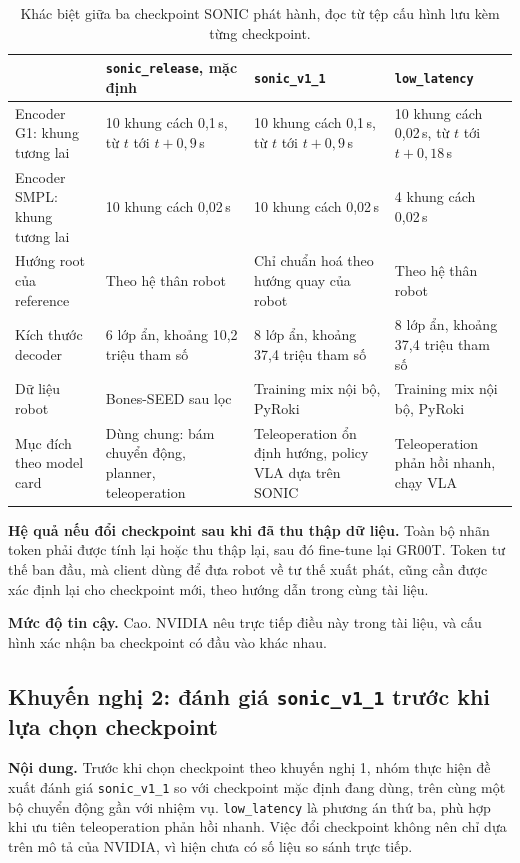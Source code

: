 \documentclass[12pt,a4paper,oneside]{report}
\newcommand{\code}[1]{\texttt{#1}}
\begin{document}
\begin{table}[htbp]
\centering\footnotesize
\caption[Khác biệt giữa ba checkpoint SONIC phát hành, đọc từ tệp cấu hình lưu kèm từng checkpoint]{Khác biệt giữa ba checkpoint SONIC phát hành, đọc từ tệp cấu hình lưu kèm từng checkpoint.}
\label{tab:ckpt_obs}
\begin{tabular}{L{3.6cm}L{3.4cm}L{3.4cm}L{3.4cm}}
\toprule
& \textbf{\code{sonic\_release}, mặc định} & \textbf{\code{sonic\_v1\_1}} & \textbf{\code{low\_latency}}\\
\midrule
Encoder G1: khung tương lai & 10 khung cách 0,1\,s, từ $t$ tới $t+0{,}9$\,s & 10 khung cách 0,1\,s, từ $t$ tới $t+0{,}9$\,s & 10 khung cách 0,02\,s, từ $t$ tới $t+0{,}18$\,s\\
Encoder SMPL: khung tương lai & 10 khung cách 0,02\,s & 10 khung cách 0,02\,s & 4 khung cách 0,02\,s\\
Hướng root của reference & Theo hệ thân robot & Chỉ chuẩn hoá theo hướng quay của robot & Theo hệ thân robot\\
Kích thước decoder & 6 lớp ẩn, khoảng 10,2 triệu tham số & 8 lớp ẩn, khoảng 37,4 triệu tham số & 8 lớp ẩn, khoảng 37,4 triệu tham số\\
Dữ liệu robot & Bones-SEED sau lọc & Training mix nội bộ, PyRoki & Training mix nội bộ, PyRoki\\
Mục đích theo model card & Dùng chung: bám chuyển động, planner, teleoperation & Teleoperation ổn định hướng, policy VLA dựa trên SONIC & Teleoperation phản hồi nhanh, chạy VLA\\
\bottomrule
\end{tabular}
\end{table}

\textbf{Hệ quả nếu đổi checkpoint sau khi đã thu thập dữ liệu.} Toàn bộ nhãn token phải được tính lại hoặc thu thập lại, sau đó fine-tune lại GR00T. Token tư thế ban đầu, mà client dùng để đưa robot về tư thế xuất phát, cũng cần được xác định lại cho checkpoint mới, theo hướng dẫn trong cùng tài liệu.

\textbf{Mức độ tin cậy.} Cao. NVIDIA nêu trực tiếp điều này trong tài liệu, và cấu hình xác nhận ba checkpoint có đầu vào khác nhau.

\subsection{Khuyến nghị 2: đánh giá \code{sonic\_v1\_1} trước khi lựa chọn checkpoint}
\label{sec:rec_v11}

\textbf{Nội dung.} Trước khi chọn checkpoint theo khuyến nghị 1, nhóm thực hiện đề xuất đánh giá \code{sonic\_v1\_1} so với checkpoint mặc định đang dùng, trên cùng một bộ chuyển động gần với nhiệm vụ. \code{low\_latency} là phương án thứ ba, phù hợp khi ưu tiên teleoperation phản hồi nhanh. Việc đổi checkpoint không nên chỉ dựa trên mô tả của NVIDIA, vì hiện chưa có số liệu so sánh trực tiếp.
\end{document}
